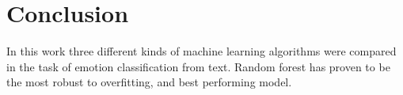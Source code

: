 \section{Conclusion}
\label{sec:conclusion}

In this work three different kinds of
machine learning algorithms were compared
in the task of emotion classification from
text. Random forest has proven to be the most
robust to overfitting, and best performing
model. 